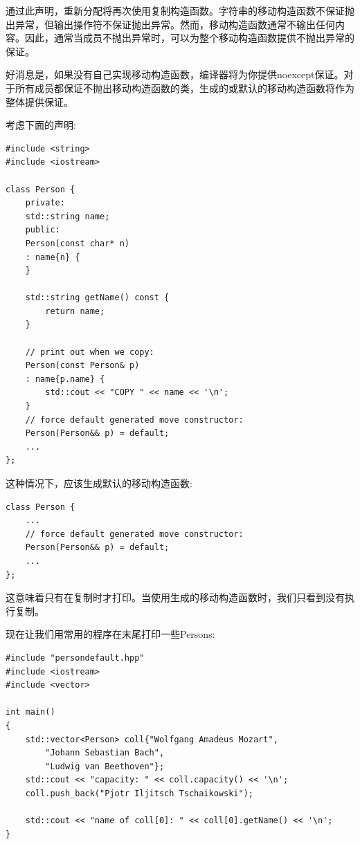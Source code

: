 通过此声明，重新分配将再次使用复制构造函数。字符串的移动构造函数不保证抛出异常，但输出操作符不保证抛出异常。然而，移动构造函数通常不输出任何内容。因此，通常当成员不抛出异常时，可以为整个移动构造函数提供不抛出异常的保证。\par

好消息是，如果没有自己实现移动构造函数，编译器将为你提供noexcept保证。对于所有成员都保证不抛出移动构造函数的类，生成的或默认的移动构造函数将作为整体提供保证。\par

考虑下面的声明:\par

{\color{red}{basics/persondefault.hpp}}\par

\begin{lstlisting}[caption={}]
#include <string>
#include <iostream>

class Person {
	private:
	std::string name;
	public:
	Person(const char* n)
	: name{n} {
	}

	std::string getName() const {
		return name;
	}

	// print out when we copy:
	Person(const Person& p)
	: name{p.name} {
		std::cout << "COPY " << name << '\n';
	}
	// force default generated move constructor:
	Person(Person&& p) = default;
	...
};
\end{lstlisting}

这种情况下，应该生成默认的移动构造函数:\par

\begin{lstlisting}[caption={}]
class Person {
	...
	// force default generated move constructor:
	Person(Person&& p) = default;
	...
};
\end{lstlisting}

这意味着只有在复制时才打印。当使用生成的移动构造函数时，我们只看到没有执行复制。\par

现在让我们用常用的程序在末尾打印一些Persons:\par

{\color{red}{basics/persondefault.cpp}}\par

\begin{lstlisting}[caption={}]
#include "persondefault.hpp"
#include <iostream>
#include <vector>

int main()
{
	std::vector<Person> coll{"Wolfgang Amadeus Mozart",
		"Johann Sebastian Bach",
		"Ludwig van Beethoven"};
	std::cout << "capacity: " << coll.capacity() << '\n';
	coll.push_back("Pjotr Iljitsch Tschaikowski");
	
	std::cout << "name of coll[0]: " << coll[0].getName() << '\n';
}
\end{lstlisting}

